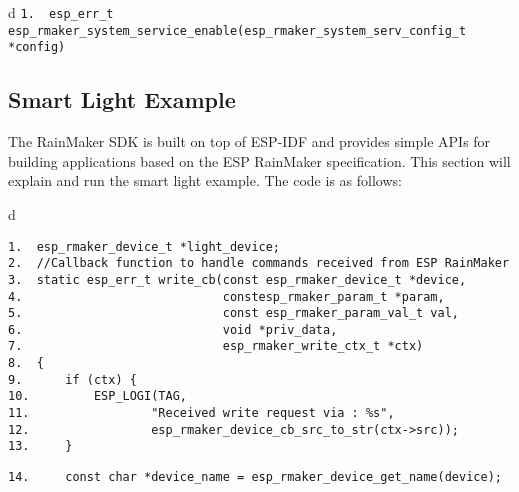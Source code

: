 \documentclass[a4paper,12pt]{book}
\begin{document}
\begin{codebloc}
\begin{tabular}{d}
\fontsize{9pt}{9pt}\selectfont
\verb|1.  esp_err_t esp_rmaker_system_service_enable(esp_rmaker_system_serv_config_t *config)|
\end{tabular}
\end{codebloc}

\subsection{Smart Light Example}
The RainMaker SDK is built on top of ESP-IDF and provides simple APIs for building applications based on the ESP RainMaker specification. This section will explain and run the smart light example. The code is as follows:

\begin{codebloc}
\begin{tabular}{d}
\vspace{2pt}
\begin{verbatim}
1.  esp_rmaker_device_t *light_device;
2.  //Callback function to handle commands received from ESP RainMaker
3.  static esp_err_t write_cb(const esp_rmaker_device_t *device,
4.                            constesp_rmaker_param_t *param,
5.                            const esp_rmaker_param_val_t val,
6.                            void *priv_data,
7.                            esp_rmaker_write_ctx_t *ctx)
8.  {
9.      if (ctx) {
10.         ESP_LOGI(TAG,
11.                 "Received write request via : %s",
12.                 esp_rmaker_device_cb_src_to_str(ctx->src));
13.     }
\end{verbatim}
\verb|14.     const char *device_name = esp_rmaker_device_get_name(device);|
\end{tabular}
\end{codebloc}
\end{document}
